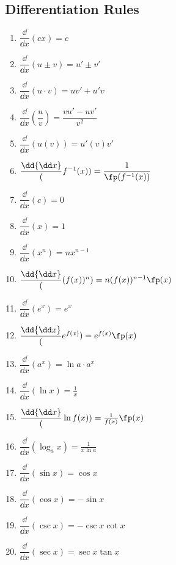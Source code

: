 

\subsection{Differentiation Rules}

\bgroup
\footnotesize
\renewcommand{\arraystretch}{2.5}
\setlength{\columnsep}{6pt}
\noindent{}
\parbox{.26\linewidth}{%
\begin{enumerate}
\item $\dfrac\dd{\dd x}(cx)=c$
\item $\dfrac\dd{\dd x}(u\pm v)=u'\pm v'$
\item $\dfrac\dd{\dd x}(u\cdot v)=uv'+u'v$%
\item $\dfrac\dd{\dd x}\left(\dfrac uv\right)=\dfrac{vu'-uv'}{v^2}$
\item $\dfrac\dd{\dd x}(u(v))=u'(v)v'$
\item $\dfrac\dd{\dd x}(f^{-1}(x))=\dfrac1{\fp(f^{-1}(x))}$
\item $\dfrac\dd{\dd x}(c)=0$
\item $\dfrac\dd{\dd x}(x)=1$
\item $\dfrac\dd{\dd x}(x^n)=nx^{n-1}$
\item $\dfrac\dd{\dd x}((f(x))^n)=n(f(x))^{n-1}\fp(x)$
\end{enumerate}}\hfill
\parbox{.22\linewidth}{%
\begin{enumerate}\setcounter{enumi}{10}
\item $\dfrac\dd{\dd x}(e^x)=e^x$
\item $\dfrac\dd{\dd x}(e^{f(x)})=e^{f(x)}\fp(x)$
\item $\dfrac\dd{\dd x}(a^x)=\ln a\cdot a^x$
\item $\dfrac\dd{\dd x}(\ln x)=\frac1x$
\item $\dfrac\dd{\dd x}(\ln f(x))=\frac1{f(x)}\fp(x)$
\item $\dfrac\dd{\dd x}(\log_a x)=\frac1{x\ln a}$
\item $\dfrac\dd{\dd x}(\sin x)=\cos x$
\item $\dfrac\dd{\dd x}(\cos x)=-\sin x$
\item $\dfrac\dd{\dd x}(\csc x)=-\csc x\cot x$%
\item $\dfrac\dd{\dd x}(\sec x)=\sec x\tan x$
\end{enumerate}}\hfill
